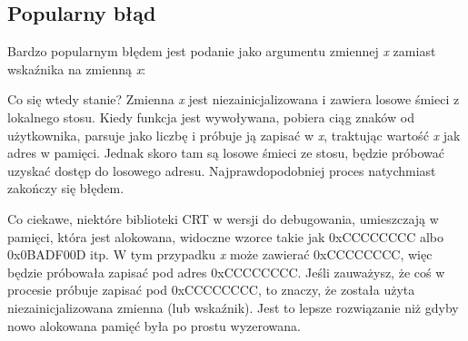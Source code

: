 \subsection{Popularny błąd}

Bardzo popularnym błędem jest podanie jako argumentu zmiennej \emph{x} zamiast wskaźnika na zmienną \emph{x}:



Co się wtedy stanie?
Zmienna \emph{x} jest niezainicjalizowana i zawiera losowe śmieci z lokalnego stosu.
Kiedy funkcja \scanf jest wywoływana, pobiera ciąg znaków od użytkownika, parsuje jako liczbę i próbuje ją zapisać w \emph{x}, traktując wartość \emph{x} jak adres w pamięci.
Jednak skoro tam są losowe śmieci ze stosu, \scanf będzie próbować uzyskać dostęp do losowego adresu.
Najprawdopodobniej proces natychmiast zakończy się błędem.

Co ciekawe, niektóre biblioteki \ac{CRT} w wersji do debugowania, umieszczają w pamięci, która jest alokowana, widoczne wzorce takie jak 0xCCCCCCCC albo 0x0BADF00D itp.
W tym przypadku \emph{x} może zawierać 0xCCCCCCCC, więc \scanf będzie próbowała zapisać pod adres 0xCCCCCCCC.
Jeśli zauważysz, że coś w procesie próbuje zapisać pod 0xCCCCCCCC, to znaczy, że
została użyta niezainicjalizowana zmienna (lub wskaźnik).
Jest to lepsze rozwiązanie niż gdyby nowo alokowana pamięć była po prostu wyzerowana.
